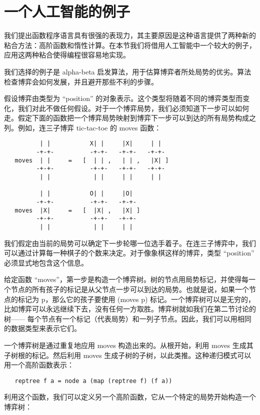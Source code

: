 \documentclass[12pt]{article}
\begin{document}
\section{一个人工智能的例子}

我们提出函数程序语言具有很强的表现力，其主要原因是这种语言提供了两种新的粘合方法：高阶函数和惰性计算。在本节我们将借用人工智能中一个较大的例子，应用这两种粘合使得编程很容易地实现。

我们选择的例子是 alpha-beta 启发算法，用于估算博弈者所处局势的优劣。算法检查博弈会如何发展，并且避开那些不利的步骤。

假设博弈由类型为 ``position'' 的对象表示。这个类型将随着不同的博弈类型而变化，我们对此不做任何假设。对于一个博弈局势，我们必须知道下一步可以如何走。假定下面的函数把一个博弈局势映射到博弈下一步可以到达的所有局势构成之列。例如，连三子博弈 tic-tac-toe 的 moves 函数：

\begin{verbatim}
          | |           X| |     |X|     | |
         -+-+-          -+-+-   -+-+-   -+-+-
   moves  | |     =   [  | | ,   | | ,   |X| ]
         -+-+-          -+-+-   -+-+-   -+-+-
          | |            | |     | |     | |

          | |           O| |     |O|
         -+-+-          -+-+-   -+-+-
   moves  |X|     =   [  |X| ,   |X| ]
         -+-+-          -+-+-   -+-+-
          | |            | |     | |
\end{verbatim}

我们假定由当前的局势可以确定下一步轮哪一位选手着子。在连三子博弈中，我们可以通过计算每一种棋子的个数来决定。对于像象棋这样的博弈，类型 ``position'' 必须显式地包含这个信息。

给定函数 ``moves''，第一步是构造一个博弈树。树的节点用局势标记，并使得每一个节点的所有孩子的标记是从父节点一步可以到达的局势。也就是说，如果一个节点的标记为 p，那么它的孩子要使用 (moves p) 标记。一个博弈树可以是无穷的，比如博弈可以永远继续下去，没有任何一方取胜。博弈树就如我们在第二节讨论的树—— 每个节点有一个标记（代表局势）和一列子节点。因此，我们可以用相同的数据类型来表示它们。

一个博弈树是通过重复地应用 moves 构造出来的。从根开始，利用 moves 生成其子树根的标记。然后利用 moves 生成子树的子树，以此类推。这种递归模式可以用一个高阶函数表示：

\begin{verbatim}
   reptree f a = node a (map (reptree f) (f a))
\end{verbatim}

利用这个函数，我们可以定义另一个高阶函数，它从一个特定的局势开始构造一个博弈树：
\end{document}
